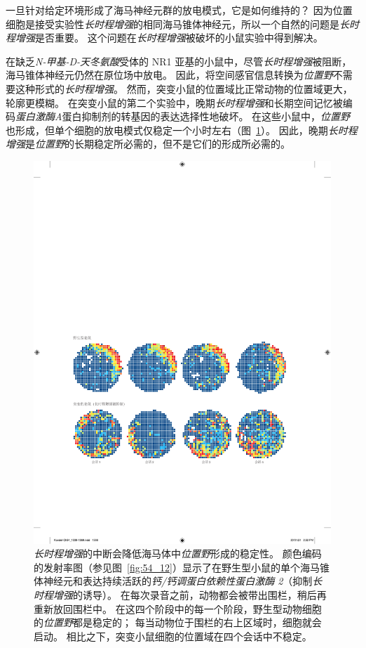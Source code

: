 一旦针对给定环境形成了海马神经元群的放电模式，它是如何维持的？
因为位置细胞是接受实验性\textit{长时程增强}的相同海马锥体神经元，所以一个自然的问题是\textit{长时程增强}是否重要。
这个问题在\textit{长时程增强}被破坏的小鼠实验中得到解决。


在缺乏\textit{N-甲基-D-天冬氨酸}受体的 NR1 亚基的小鼠中，尽管\textit{长时程增强}被阻断，海马锥体神经元仍然在原位场中放电。
因此，将空间感官信息转换为\textit{位置野}不需要这种形式的\textit{长时程增强}。
然而，突变小鼠的位置域比正常动物的位置域更大，轮廓更模糊。
在突变小鼠的第二个实验中，晚期\textit{长时程增强}和长期空间记忆被编码\textit{蛋白激酶A}蛋白抑制剂的转基因的表达选择性地破坏。
在这些小鼠中，\textit{位置野}也形成，但单个细胞的放电模式仅稳定一个小时左右（图~\ref{fig:54_16}）。
因此，晚期\textit{长时程增强}是\textit{位置野}的长期稳定所必需的，但不是它们的形成所必需的。


\begin{figure}[htbp]
	\centering
	\includegraphics[width=1.0\linewidth]{chap54/fig_54_16}
	\caption{\textit{长时程增强}的中断会降低海马体中\textit{位置野}形成的稳定性。
		颜色编码的发射率图（参见图~\ref{fig:54_12}）显示了在野生型小鼠的单个海马锥体神经元和表达持续活跃的\textit{钙/钙调蛋白依赖性蛋白激酶 2}（抑制\textit{长时程增强}的诱导）。
		在每次录音之前，动物都会被带出围栏，稍后再重新放回围栏中。
		在这四个阶段中的每一个阶段，野生型动物细胞的\textit{位置野}都是稳定的；
		每当动物位于围栏的右上区域时，细胞就会启动。
		相比之下，突变小鼠细胞的位置域在四个会话中不稳定\cite{rotenberg1996mice}。}
	\label{fig:54_16}
\end{figure}


